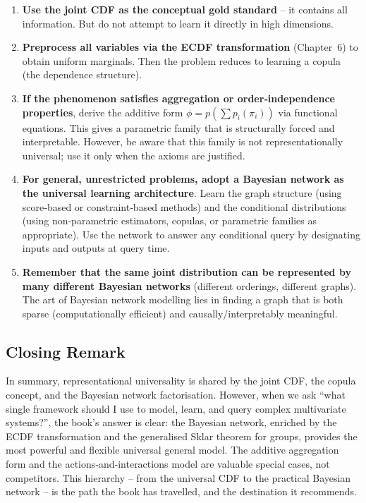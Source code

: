 \begin{enumerate}
    \item \textbf{Use the joint CDF as the conceptual gold standard} – it contains all information. But do not attempt to learn it directly in high dimensions.
    \item \textbf{Preprocess all variables via the ECDF transformation} (Chapter~6) to obtain uniform marginals. Then the problem reduces to learning a copula (the dependence structure).
    \item \textbf{If the phenomenon satisfies aggregation or order‑independence properties}, derive the additive form $\phi = p(\sum p_i(\pi_i))$ via functional equations. This gives a parametric family that is structurally forced and interpretable. However, be aware that this family is not representationally universal; use it only when the axioms are justified.
    \item \textbf{For general, unrestricted problems, adopt a Bayesian network as the universal learning architecture}. Learn the graph structure (using score‑based or constraint‑based methods) and the conditional distributions (using non‑parametric estimators, copulas, or parametric families as appropriate). Use the network to answer any conditional query by designating inputs and outputs at query time.
    \item \textbf{Remember that the same joint distribution can be represented by many different Bayesian networks} (different orderings, different graphs). The art of Bayesian network modelling lies in finding a graph that is both sparse (computationally efficient) and causally/interpretably meaningful.
\end{enumerate}

\subsection{Closing Remark}

In summary, representational universality is shared by the joint CDF, the copula concept, and the Bayesian network factorisation. However, when we ask ``what single framework should I use to model, learn, and query complex multivariate systems?'', the book’s answer is clear: the Bayesian network, enriched by the ECDF transformation and the generalised Sklar theorem for groups, provides the most powerful and flexible universal general model. The additive aggregation form and the actions‑and‑interactions model are valuable special cases, not competitors. This hierarchy – from the universal CDF to the practical Bayesian network – is the path the book has travelled, and the destination it recommends.

